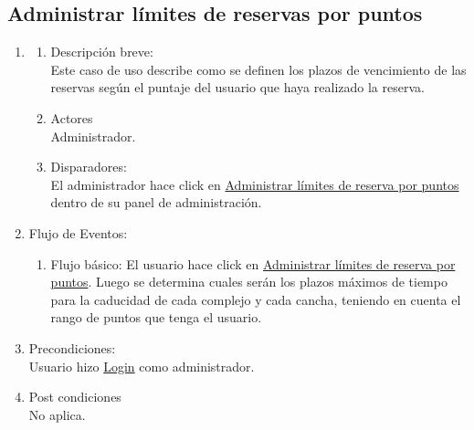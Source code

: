 \documentclass[a4paper,11pt]{article}
\begin{document}
\subsection{Administrar límites de reservas por puntos}
\begin{enumerate}

    \item
    \begin{enumerate}
    \item Descripción breve: \\
        Este caso de uso describe como se definen los plazos de vencimiento de
        las reservas según el puntaje del usuario que haya realizado la reserva.
    \item Actores \\
        Administrador.
    \item Disparadores: \\
        El administrador hace click en 
        \underline{Administrar límites de reserva por puntos}
        dentro de su panel de administración.
    \end{enumerate}

    \item Flujo de Eventos: 

    \begin{enumerate}

        \item Flujo básico:
            El usuario hace click en \underline{Administrar límites de reserva
            por puntos}.
            Luego se determina cuales serán los plazos máximos de tiempo para la
            caducidad de cada complejo y cada cancha, teniendo en cuenta el rango
            de puntos que tenga el usuario.
    \end{enumerate}

    \item Precondiciones: \\
        Usuario hizo \underline{Login} como administrador.

    \item Post condiciones \\
        No aplica.

\end{enumerate}
\end{document}
